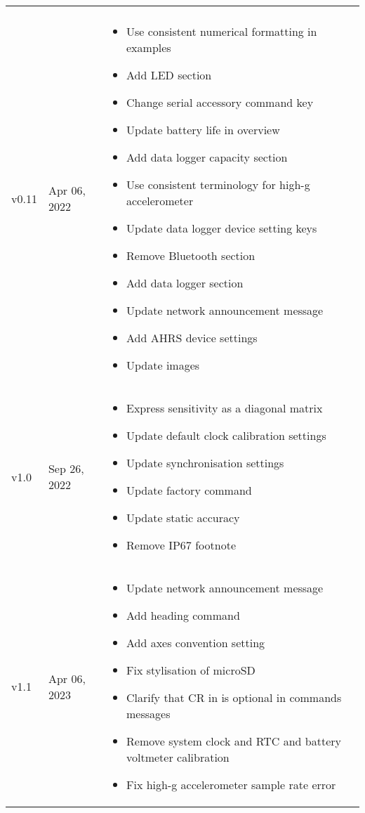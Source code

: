 \begin{longtable}{| >{\centering}p{} | p{} | >{\raggedright\arraybackslash}p{} |}
\begin{itemize}
        \end{itemize}\\
        v0.11 & Apr 06, 2022 &
        \begin{itemize}
			\item Use consistent numerical formatting in examples
			\item Add \ac{LED} section
			\item Change serial accessory command key
			\item Update battery life in overview
			\item Add data logger capacity section
			\item Use consistent terminology for high-g accelerometer
			\item Update data logger device setting keys
			\item Remove Bluetooth section
			\item Add data logger section
			\item Update network announcement message
			\item Add AHRS device settings
			\item Update images
		\end{itemize}\\
        v1.0 & Sep 26, 2022 &
        \begin{itemize}
			\item Express sensitivity as a diagonal matrix
			\item Update default clock calibration settings
			\item Update synchronisation settings
			\item Update factory command
			\item Update static accuracy
			\item Remove IP67 footnote
        \end{itemize}\\
        v1.1 & Apr 06, 2023 &
        \begin{itemize}
			\item Update network announcement message
			\item Add heading command
			\item Add axes convention setting
			\item Fix stylisation of microSD
			\item Clarify that \ac{CR} in is optional in commands messages
			\item Remove system clock and \ac{RTC} and battery voltmeter calibration
			\item Fix high-g accelerometer sample rate error

\end{itemize}
\end{longtable}
